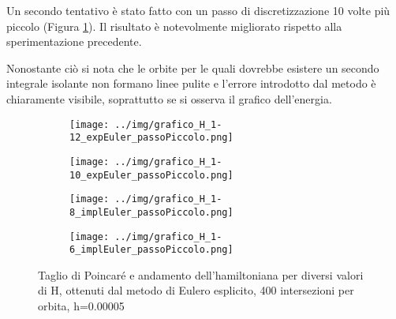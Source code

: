 \documentclass[a4paper]{article}
\numberwithin{equation}{section}
\numberwithin{figure}{section}
\begin{document}
Un secondo tentativo è stato fatto con un passo di discretizzazione 10 volte più piccolo
(Figura \ref{img:euleroesplicitopiccolo}). Il risultato è notevolmente migliorato rispetto
alla sperimentazione precedente.

Nonostante ciò si nota che le orbite per le quali dovrebbe esistere un secondo integrale
isolante non formano linee pulite e l'errore introdotto dal metodo è chiaramente visibile,
soprattutto se si osserva il grafico dell'energia.

\begin{figure}[h!]
	\centering
	\begin{subfigure}[t]{.49\textwidth}
		\centering
		\texttt{[image: ../img/grafico\_H\_1-12\_expEuler\_passoPiccolo.png]}
	\end{subfigure}
	\begin{subfigure}[t]{.49\textwidth}
		\centering
		\texttt{[image: ../img/grafico\_H\_1-10\_expEuler\_passoPiccolo.png]}
	\end{subfigure}
	\begin{subfigure}[t]{.49\textwidth}
		\centering
		\texttt{[image: ../img/grafico\_H\_1-8\_implEuler\_passoPiccolo.png]}
	\end{subfigure}
	\begin{subfigure}[t]{.49\textwidth}
		\centering
		\texttt{[image: ../img/grafico\_H\_1-6\_implEuler\_passoPiccolo.png]}
	\end{subfigure}

	\caption{Taglio di Poincaré e andamento dell'hamiltoniana per diversi valori di H,
	ottenuti dal metodo di Eulero esplicito, 400 intersezioni per orbita, h=0.00005}
	\label{img:euleroesplicitopiccolo}
\end{figure}

\clearpage
\printbibliography
\end{document}

